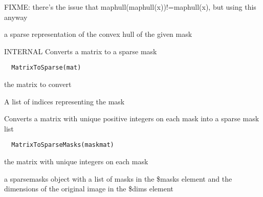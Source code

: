 \documentclass[a4paper]{book}
\begin{document}
%
\begin{Details}\relax
FIXME: there's the issue that
maphull(maphull(x))!=maphull(x), but using this anyway
\end{Details}
%
\begin{Value}
a sparse representation of the convex hull of the given
mask
\end{Value}
%
\begin{Description}\relax
INTERNAL Converts a matrix to a sparse mask
\end{Description}
%
\begin{Usage}
\begin{verbatim}
  MatrixToSparse(mat)
\end{verbatim}
\end{Usage}
%
\begin{Arguments}
\begin{ldescription}
\item[\code{mat}] the matrix to convert
\end{ldescription}
\end{Arguments}
%
\begin{Value}
A list of indices representing the mask
\end{Value}
%
\begin{Description}\relax
Converts a matrix with unique positive integers on each
mask into a sparse mask list
\end{Description}
%
\begin{Usage}
\begin{verbatim}
  MatrixToSparseMasks(maskmat)
\end{verbatim}
\end{Usage}
%
\begin{Arguments}
\begin{ldescription}
\item[\code{maskmat}] the matrix with unique integers on each
mask

\item[\code{return}] a sparsemasks object with a list of masks
in the \$masks element and the dimensions of the original
image in the \$dims element
\end{ldescription}
\end{Arguments}
\end{document}

